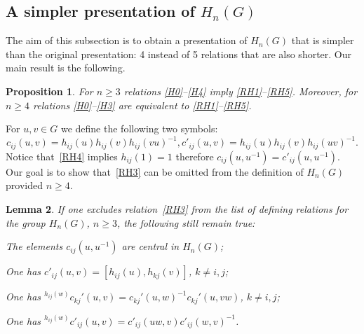 \documentclass[oneside, 12pt]{amsart}
\theoremstyle{plain}
\numberwithin{equation}{section}
\newtheorem{lemma}{Lemma}
\numberwithin{lemma}{section}
\newtheorem{prop}[lemma]{Proposition}
\theoremstyle{remark}
\theoremstyle{definition}
\begin{document}
\subsection{A simpler presentation of $H_n(G)$}
The aim of this subsection is to obtain a presentation of $H_n(G)$ that is simpler than the original presentation: 4 instead of 5 relations that are also shorter. 
Our main result is the following.
\begin{prop} \label{prop:simpler} 
For $n\geq 3$ relations \eqref{H0}--\eqref{H4} imply \eqref{RH1}--\eqref{RH5}.
Moreover, for $n\geq 4$ relations \eqref{H0}--\eqref{H3} are equivalent to \eqref{RH1}--\eqref{RH5}.
\end{prop}
For $u, v\in G$ we define the following two symbols:
\[c_{ij}(u,v)=h_{ij}(u)h_{ij}(v)h_{ij}(vu)^{-1}, c'_{ij}(u,v)=h_{ij}(u)h_{ij}(v)h_{ij}(uv)^{-1}.\]
Notice that~\eqref{RH4} implies $h_{ij}(1)=1$ therefore $c_{ij}(u, u^{-1}) = c'_{ij}(u, u^{-1})$.
Our goal is to show that~\eqref{RH3} can be omitted from the definition of $H_n(G)$ provided $n \geq 4$.
\begin{lemma} \label{item-lem33} If one excludes relation~\eqref{RH3} from the list of defining relations for the group $H_n(G)$, $n\geq 3$,
 the following still remain true:
 \begin{lemlist}
\item \label{item-lem33-cntr} The elements $c_{ij}(u, u^{-1})$ are central in $H_n(G)$;
\item \label{item-lem33-comm} One has $c'_{ij}(u, v) = [h_{ij}(u), h_{kj}(v)]$, $k\neq i, j$;
\item \label{item-lem33-conj}  One has ${}^{h_{ij}(w)}c_{kj}'(u, v) = c_{kj}'(u, w)^{-1} c_{kj}'(u, vw)$, $k\neq i, j$;
\item \label{item-lem33-conj2} One has ${}^{h_{ij}(w)} c'_{ij}(u, v) = c'_{ij}(uw, v) c'_{ij}(w, v)^{-1}$.
 \end{lemlist}
\end{lemma}
\end{document}
